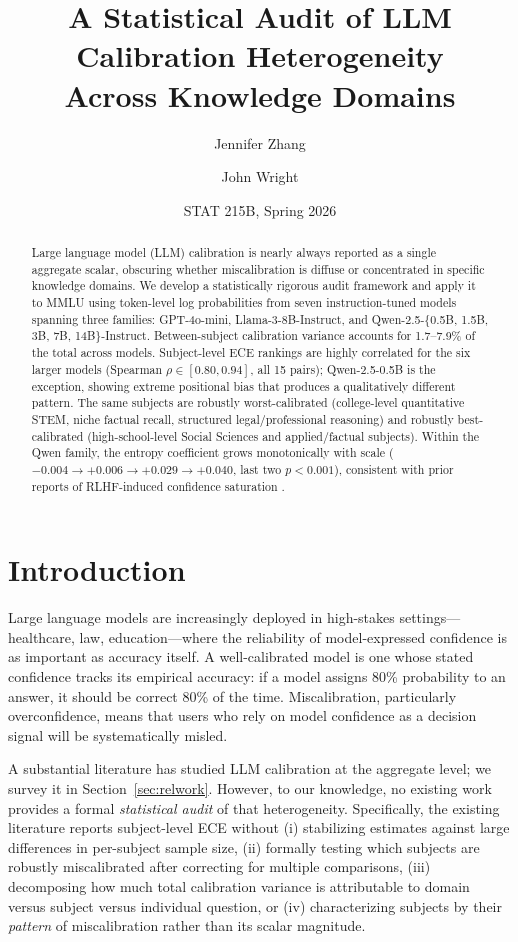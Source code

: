 \documentclass[11pt]{article}
\title{A Statistical Audit of LLM Calibration Heterogeneity\\Across Knowledge Domains}
\author{Jennifer Zhang \and John Wright}
\date{STAT 215B, Spring 2026}
\begin{document}
\maketitle

\begin{abstract}
Large language model (LLM) calibration is nearly always reported as a single
aggregate scalar, obscuring whether miscalibration is diffuse or concentrated
in specific knowledge domains. We develop a statistically rigorous audit
framework and apply it to MMLU \citep{hendrycks2021measuring} using token-level
log probabilities from seven instruction-tuned models spanning three families:
GPT-4o-mini, Llama-3-8B-Instruct, and Qwen-2.5-\{0.5B, 1.5B, 3B, 7B,
14B\}-Instruct. Between-subject calibration variance accounts for 1.7--7.9\%
of the total across models. Subject-level ECE rankings are highly correlated
for the six larger models (Spearman $\rho \in [0.80, 0.94]$, all 15 pairs);
Qwen-2.5-0.5B is the exception, showing extreme positional bias that produces
a qualitatively different pattern. The same subjects are robustly
worst-calibrated (college-level quantitative STEM, niche factual recall,
structured legal/professional reasoning) and robustly best-calibrated
(high-school-level Social Sciences and applied/factual subjects). Within the
Qwen family, the entropy coefficient grows monotonically with scale
($-0.004 \to +0.006 \to +0.029 \to +0.040$, last two $p<0.001$), consistent
with prior reports of RLHF-induced confidence saturation
\citep{kadavath2022language, nakkiran2025trained}.
\end{abstract}

\section{Introduction}

Large language models are increasingly deployed in high-stakes settings---healthcare,
law, education---where the reliability of model-expressed confidence is as important as
accuracy itself. A well-calibrated model is one whose stated confidence tracks its
empirical accuracy: if a model assigns 80\% probability to an answer, it should be
correct 80\% of the time. Miscalibration, particularly overconfidence, means that users
who rely on model confidence as a decision signal will be systematically misled.

A substantial literature has studied LLM calibration at the aggregate level; we survey it in Section~\ref{sec:relwork}. However, to our knowledge, no existing work provides a formal \emph{statistical audit} of that heterogeneity. Specifically, the existing literature reports subject-level ECE without (i) stabilizing estimates
against large differences in per-subject sample size, (ii) formally testing which
subjects are robustly miscalibrated after correcting for multiple comparisons, (iii)
decomposing how much total calibration variance is attributable to domain versus subject
versus individual question, or (iv) characterizing subjects by their \emph{pattern} of
miscalibration rather than its scalar magnitude.
\end{document}
